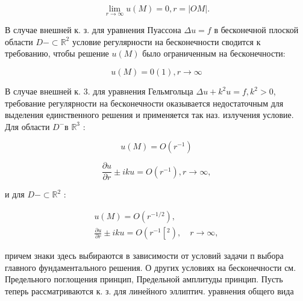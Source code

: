\documentclass[10pt]{article}
\begin{document}
\[

\lim _{r \rightarrow \infty} u(M)=0, r=|O M| .

\]



В случае внешней к. з. для уравнения Пуассона $\Delta u=f$ в бесконечной плоской области $D-\subset \mathbb{R}^{2}$ условие регулярности на бесконечности сводится к требованию, чтобы решение $u(M)$ было ограниченным на бесконечности:



\[

u(M)=0(1), r \rightarrow \infty

\]



В случае внешней к. 3. для уравнения Гельмгольца $\Delta u+k^{2} u=f, k^{2}>0$, требование регулярности на бесконечности оказывается недостаточным для выделения единственного решения и применяется так наз. излучения условие. Для области $D^{-}$в $\mathbb{R}^{3}$ :



\[

u(M)=O\left(r^{-1}\right)

\]



\[

\frac{\partial u}{\partial r} \pm i k u=O\left(r^{-1}\right), r \rightarrow \infty,

\]



и для $D-\subset \mathbb{R}^{2}$ :



\[

\begin{gathered}

u(M)=O\left(r^{-1 / 2}\right), \\

\frac{\partial u}{\partial r} \pm i k u=O\left(r^{-1}\left[^{2}\right), \quad r \rightarrow \infty,\right.

\end{gathered}

\]



причем знаки здесь выбираются в зависимости от условий задачи п выбора главного фундаментального решения. О других условиях на бесконечности см. Предельного поглощения принцип, Предельной амплитуды принцип. Пусть теперь рассматриваются к. з. для линейного эллиптич. уравнения общего вида
\end{document}
